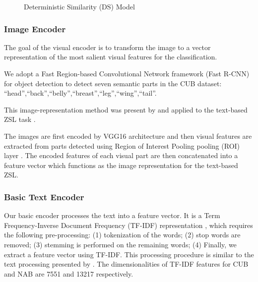 \documentclass[11pt,a4paper]{article}
\begin{document}
\begin{figure}[t]
\centering
{}
 \caption{Deterministic Similarity (DS) Model}
\label{fig:DS}
\end{figure}

\subsubsection{Image Encoder}
\label{section:Image_Encoder}
The goal of the visual encoder is to transform the image to a vector representation of the most salient visual features for the classification.\par

We adopt a 
Fast Region-based Convolutional Network framework (Fast R-CNN) for object detection   \citep{girshick2015fast} to detect seven semantic parts in the CUB dataset:
\enquote{head},\enquote{back},\enquote{belly},\enquote{breast},\enquote{leg},\enquote{wing},\enquote{tail}.\par
This image-representation method was present by \citet{zhang2016spda} and applied to the text-based ZSL task \cite{zhu2018generative,elhoseiny2017link} . \par

The images are first encoded by VGG16 architecture \citep{simonyan2014very} and then visual features are extracted from parts detected using Region of Interest Pooling pooling (ROI) layer \citep{girshick2015fast}. %
The encoded features of each visual part are then concatenated into a feature vector which functions as the image representation for the text-based ZSL.


\subsubsection{Basic Text Encoder}
\label{section:Text_Encoder}
Our basic encoder processes the text into a feature vector. It is a Term Frequency-Inverse Document Frequency (TF-IDF)  representation \citep{salton1988term}, which requires the following pre-processing: (1) tokenization of the words; (2) stop words are removed; (3) stemming is performed on the remaining words; (4) Finally, we extract a feature vector using TF-IDF. This processing procedure is similar to the text processing presented by \citet{zhu2018generative}.
The dimensionalities of TF-IDF features for
CUB and NAB are 7551 and 13217 respectively. 
\end{document}
